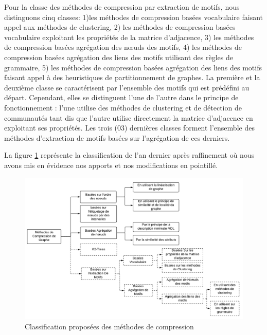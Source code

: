Pour la classe des méthodes de compression par extraction de motifs, nous distinguons cinq classes: 1)les méthodes de compression basées vocabulaire faisant appel aux méthodes de clustering, 2) les méthodes de compression basées vocabulaire exploitant les propriétés de la matrice d'adjacence, 3) les méthodes de compression basées agrégation des nœuds des motifs, 4) les méthodes de compression basées agrégation des liens des motifs utilisant des règles de grammaire, 5) les méthodes de compression basées agrégation des liens des motifs faisant appel à des heuristiques de partitionnement de graphes. La première et la deuxième classe se caractérisent par l'ensemble des motifs qui est prédéfini au départ. Cependant, elles se distinguent l'une de l'autre dans le principe de fonctionnement : l'une utilise des méthodes de clustering et de détection de communautés tant dis que l'autre utilise directement la matrice d'adjacence en exploitant ses propriétés. Les trois (03) dernières classes forment l'ensemble des méthodes d'extraction de motifs basées sur l'agrégation de ces derniers. 




 La figure \ref{classif} représente la classification de l'an dernier après raffinement où nous avons mis en évidence nos apports et nos modifications en pointillé.


 \begin{figure}[H]
		\includegraphics[scale=0.6]{./ressources/image/Classification.png}
		\caption{Classification proposées des méthodes de compression}
		\label{classif}
	\end{figure}





